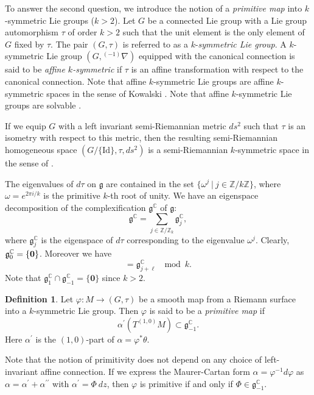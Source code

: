 \documentclass[12pt]{amsart}
\theoremstyle{definition}
\newtheorem{Definition}{Definition}[section]
\theoremstyle{remark}
\numberwithin{equation}{section}
\begin{document}
 To answer the second question, we introduce the 
 notion 
of a \textit{ primitive map} into $k$-symmetric Lie groups ($k>2$). 
 Let $G$ be a connected Lie group with a Lie group automorphism $\tau$ of order $k>2$ 
 such that the unit element is the only element of $G$ fixed by $\tau$.
 The pair $(G,\tau)$ is referred to as a $k$-\textit{symmetric Lie group}. 
 A $k$-symmetric Lie group $(G,{}^{(-1)}\nabla)$ equipped 
 with the canonical connection 
 is said to be \textit{affine $k$-symmetric} if $\tau$ is an affine transformation 
 with respect to the canonical connection. Note that affine $k$-symmetric Lie groups are 
 affine $k$-symmetric spaces in the sense of Kowalski \cite{Kowalski}. Note that 
 affine $k$-symmetric Lie groups are solvable \cite[Proposition V.9]{Kowalski}.

 If we equip $G$ with a left invariant semi-Riemannian metric $ds^2$  
 such that $\tau$ is an isometry with respect to this metric, 
 then the resulting semi-Riemannian homogeneous space 
 $(G/\{\mathrm{Id}\},\tau,ds^2)$ is a semi-Riemannian $k$-symmetric space in the sense of 
 \cite{Kowalski}.

 The eigenvalues of $d\tau$ on $\mathfrak{g}$ are 
 contained in the set
 $\{\omega^{j}\ \vert \ j\in \mathbb{Z}/k\mathbb{Z}\}$, where 
 $\omega=e^{2\pi{i}/k}$ is the primitive $k$-th root of unity.  
 We have an eigenspace decomposition
 of the complexification
 $\mathfrak{g}^\mathbb{C}$ of $\mathfrak{g}$:
\begin{equation*}
\mathfrak{g}^\mathbb{C}=
\sum_{j \in \mathbb{Z}/\mathbb{Z}_k}\mathfrak{g}^\mathbb{C}_{j},
\end{equation*}
 where ${\mathfrak g}_{j}^{\mathbb C}$ is the
 eigenspace of $d\tau$ 
 corresponding to the eigenvalue $\omega^j$.
 Clearly, ${\mathfrak g}_{0}^\mathbb{C}=\{{\mbox{\boldmath ${0}$}}\}$. 
 Moreover we have 
\begin{equation*}
[{\mathfrak g}^\mathbb{C}_{j},\ {\mathfrak g}^\mathbb{C}_{\ell}]=
{\mathfrak g}^\mathbb{C}_{j+\ell} 
\ \mod k.
\end{equation*}
 Note that ${\mathfrak g}^\mathbb{C}_{1}\cap
 {\mathfrak g}^\mathbb{C}_{-1}=\{{\mathbf 0}\}$
 since $k>2$.
\begin{Definition}
 Let $\varphi:M\to (G,\tau)$ be a smooth map from a Riemann surface
 into a $k$-symmetric Lie group. Then $\varphi$ is said to be 
 a \textit{primitive map} if
\begin{equation*}
\alpha^{\prime}(T^{(1,0)}M)\subset \mathfrak{g}^{\mathbb C}_{-1}.
\end{equation*}
 Here $\alpha^{\prime}$ is the $(1,0)$-part of $\alpha=\varphi^{*}\theta$.
\end{Definition}
 Note that the notion of  primitivity does not depend
 on any choice of left-invariant 
 affine connection. If we express the Maurer-Cartan form 
 $\alpha=\varphi^{-1}d\varphi$ as $\alpha=\alpha^{\prime}+\alpha^{\prime\prime}$ with 
 $\alpha^{\prime}=\varPhi\>dz$, then $\varphi$ is primitive 
 if and only if $\varPhi\in \mathfrak{g}_{-1}^{\mathbb C}$. 
\end{document}
